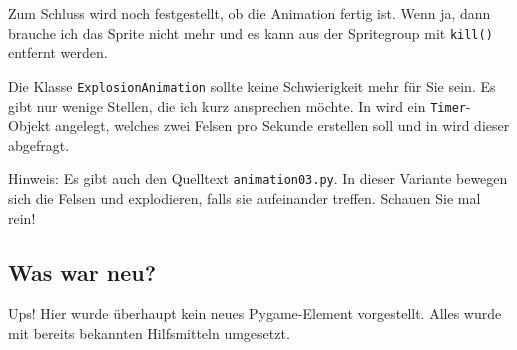 Zum Schluss wird noch festgestellt, ob die Animation fertig ist. Wenn ja, dann brauche ich das Sprite nicht mehr und es kann aus der Spritegroup mit \texttt{kill()} entfernt werden.



Die Klasse \texttt{ExplosionAnimation} sollte keine Schwierigkeit mehr für Sie sein. Es gibt nur wenige Stellen, die ich kurz ansprechen möchte. In  wird ein \texttt{Timer}-Objekt angelegt, welches zwei Felsen pro Sekunde erstellen soll und in  wird dieser abgefragt.


Hinweis: Es gibt auch den Quelltext \texttt{animation03.py}. In dieser Variante bewegen sich die Felsen und explodieren, falls sie aufeinander treffen. Schauen Sie mal rein!

\subsection*{Was war neu?}

Ups! Hier wurde überhaupt kein neues Pygame-Element vorgestellt. Alles wurde mit bereits bekannten Hilfsmitteln umgesetzt. 


